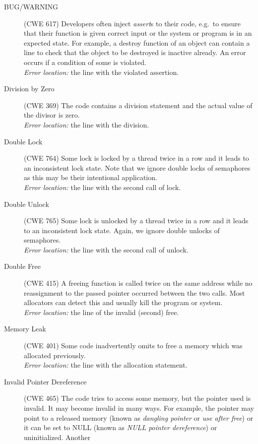 \begin{description}
\item[BUG/WARNING] (CWE 617) Developers often inject \emph{assert}s
  to their code, e.g.\ to ensure that their function is given correct input or
  the system or program is in an expected state.  For example, a destroy
  function of an object  can contain a line
   to check that the object to be destroyed is
  inactive already. An error occurs if a condition of some  is
  violated.\\
  \emph{Error location:} the line with the violated assertion.
\item[Division by Zero] (CWE 369) The code contains a division
  statement and the actual value of the divisor is zero. \\
  \emph{Error location:} the line with the division.
\item[Double Lock] (CWE 764) Some lock is locked by a thread twice
  in a row and it leads to an inconsistent lock state. Note that we ignore
  double locks of semaphores as this may be their intentional application.\\
  \emph{Error location:} the line with the second call of lock.
\item[Double Unlock] (CWE 765) Some lock is unlocked by a thread
  twice in a row and it leads to an
  inconsistent lock state. Again, we ignore double unlocks of semaphores.\\
  \emph{Error location:} the line with the second call of unlock.
\item[Double Free] (CWE 415) A freeing function is called twice on
  the same address while no reassignment to the passed pointer
  occurred between the two calls. Most allocators can detect this and usually
  kill the program or system. \\
  \emph{Error location:} the line of the invalid (second) free.
\item[Memory Leak] (CWE 401) Some code inadvertently omits to free a memory
  which was allocated previously. \\
  \emph{Error location:} the line with the allocation statement.
\item[Invalid Pointer Dereference] (CWE 465) The code tries to
  access some memory, but the pointer used is invalid. It may become invalid
  in many ways. For example, the pointer may point to a released memory (known
  as \emph{dangling pointer} or \emph{use after free}) or it can be set to
  NULL (known as \emph{NULL pointer dereference}) or uninitialized. Another

\end{description}
